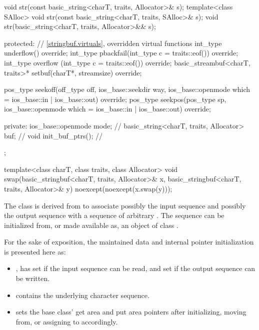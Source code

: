 \begin{codeblock}
{{    void str(const basic_string<charT, traits, Allocator>& s);
    template<class SAlloc>
      void str(const basic_string<charT, traits, SAlloc>& s);
    void str(basic_string<charT, traits, Allocator>&& s);

  protected:
    // \ref{stringbuf.virtuals}, overridden virtual functions
    int_type underflow() override;
    int_type pbackfail(int_type c = traits::eof()) override;
    int_type overflow (int_type c = traits::eof()) override;
    basic_streambuf<charT, traits>* setbuf(charT*, streamsize) override;

    pos_type seekoff(off_type off, ios_base::seekdir way,
                     ios_base::openmode which
                      = ios_base::in | ios_base::out) override;
    pos_type seekpos(pos_type sp,
                     ios_base::openmode which
                      = ios_base::in | ios_base::out) override;

  private:
    ios_base::openmode mode;                        // \expos
    basic_string<charT, traits, Allocator> buf;     // \expos
    void init_buf_ptrs();                           // \expos
  };

  template<class charT, class traits, class Allocator>
    void swap(basic_stringbuf<charT, traits, Allocator>& x,
              basic_stringbuf<charT, traits, Allocator>& y) noexcept(noexcept(x.swap(y)));
}
\end{codeblock}

\pnum
The class
is derived from
to associate possibly the input sequence and possibly
the output sequence with a sequence of arbitrary
.
The sequence can be initialized from, or made available as, an object of class
.

\pnum
For the sake of exposition,
the maintained data and internal pointer initialization is presented here as:
\begin{itemize}
\item
  , has
   set if the input sequence can be read, and
   set if the output sequence can be written.
\item
  contains the underlying character sequence.
\item
   sets the base class'
  get area and
  put area pointers
  after initializing, moving from, or assigning to  accordingly.
\end{itemize}

